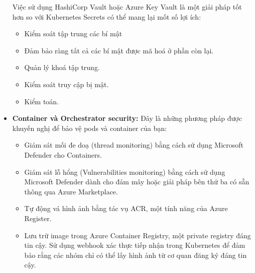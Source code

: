 \begin{itemize}
\begin{itemize}
        \end{itemize}
    Việc sử dụng HashiCorp Vault hoặc Azure Key Vault là một giải pháp tốt hơn so với Kubernetes Secrets có thể mang lại mốt số lợi ích:
        \begin{itemize}
            \item Kiểm soát tập trung các bí mật
            \item Đảm bảo ràng tất cả các bí mật được mã hoá ở phần còn lại.
            \item Quản lý khoá tập trung.
            \item Kiểm soát truy cập bị mật.
            \item Kiểm toán.
        \end{itemize}
    \item \textbf{Container và Orchestrator security:}
    Đây là những phương pháp được khuyến nghị để bảo vệ pods và container của bạn:
        \begin{itemize}
            \item Giám sát mối đe doạ (thread monitoring) bằng cách sử dụng Microsoft Defender cho Containers.
            \item Giám sát lỗ hổng (Vulnerabilities monitoring) bằng cách sử dụng Microsoft Defender dành cho đám mây hoặc giải pháp bên thứ ba có sẵn thông qua Azure Marketplace.
            \item Tự động vá hình ảnh bằng tác vụ ACR, một tính năng của Azure Register. 
            \item Lưu trữ image trong Azure Container Registry, một private registry đáng tin cậy. Sử dụng webhook xác thực tiếp nhận trong Kubernetes để đảm bảo rằng các nhóm chỉ có thể lấy hình ảnh từ cơ quan đăng ký đáng tin cậy.
        \end{itemize}
      
\end{itemize}
\newpage
